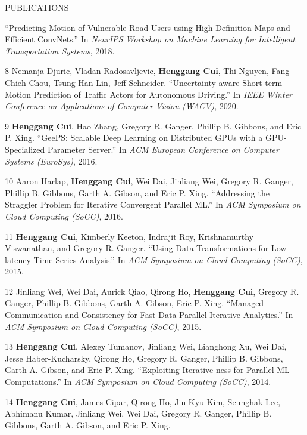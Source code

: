 \documentclass{resume} %
\begin{document}
\begin{rSection}{PUBLICATIONS}
{        ``Predicting Motion of Vulnerable Road Users using High-Definition Maps and Efficient ConvNets.''
        In \emph{NeurIPS Workshop on Machine Learning for Intelligent Transportation Systems}, 2018.
    \item
    [8]
        Nemanja Djuric, Vladan Radosavljevic, {\bf Henggang Cui}, Thi Nguyen, Fang-Chieh Chou, Tsung-Han Lin, Jeff Schneider.
        ``Uncertainty-aware Short-term Motion Prediction of Traffic Actors for Autonomous Driving.''
        In \emph{IEEE Winter Conference on Applications of Computer Vision (WACV)}, 2020.
    \item
    [9]
        {\bf Henggang Cui}, Hao Zhang, Gregory R. Ganger, Phillip B. Gibbons, and Eric P. Xing.
        ``GeePS: Scalable Deep Learning on Distributed GPUs with a GPU-Specialized Parameter Server.''
        In \emph{ACM European Conference on Computer Systems (EuroSys)}, 2016.
    \item
    [10]
        Aaron Harlap, {\bf Henggang Cui}, Wei Dai, Jinliang Wei, Gregory R. Ganger, Phillip B. Gibbons, Garth A. Gibson, and Eric P. Xing.
        ``Addressing the Straggler Problem for Iterative Convergent Parallel ML.''
        In \emph{ACM Symposium on Cloud Computing (SoCC)}, 2016.
    \item
    [11]
        {\bf Henggang Cui}, Kimberly Keeton, Indrajit Roy, Krishnamurthy Viswanathan, and Gregory R. Ganger.
        ``Using Data Transformations for Low-latency Time Series Analysis.''
        In \emph{ACM Symposium on Cloud Computing (SoCC)}, 2015.
    \item
    [12]
        Jinliang Wei, Wei Dai, Aurick Qiao, Qirong Ho, {\bf Henggang Cui}, Gregory R. Ganger, Phillip B. Gibbons, Garth A. Gibson, Eric P. Xing.
        ``Managed Communication and Consistency for Fast Data-Parallel Iterative Analytics.''
        In \emph{ACM Symposium on Cloud Computing (SoCC)}, 2015.
    \item
    [13]
        {\bf Henggang Cui}, Alexey Tumanov, Jinliang Wei, Lianghong Xu, Wei Dai, Jesse Haber-Kucharsky, Qirong Ho, Gregory R. Ganger, Phillip B. Gibbons, Garth A. Gibson, and Eric P. Xing.
        ``Exploiting Iterative-ness for Parallel ML Computations.''
        In \emph{ACM Symposium on Cloud Computing (SoCC)}, 2014.
    \item
    [14]
        {\bf Henggang Cui}, James Cipar, Qirong Ho, Jin Kyu Kim, Seunghak Lee, Abhimanu Kumar, Jinliang Wei, Wei Dai, Gregory R. Ganger, Phillip B. Gibbons, Garth A. Gibson, and Eric P. Xing.
}
\end{rSection}
\end{document}
